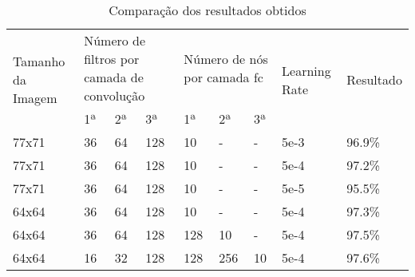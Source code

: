 \documentclass[conference]{IEEEtran}
\begin{document}
\begin{table*}[]
\centering
\begin{tabular}{|l|l|l|l|l|l|l|l|l|}
\hline
\multirow{2}{*}{Tamanho da Imagem} & \multicolumn{3}{l|}{Número de filtros por camada de convolução} & \multicolumn{3}{l|}{Número de nós por camada fc} & \multirow{2}{*}{Learning Rate} & \multirow{2}{*}{Resultado} \\ \cline{2-7}
                                   & 1ª                  & 2ª                  & 3ª                  & 1ª              & 2ª             & 3ª            &                                &                            \\ \hline
77x71                              & 36                  & 64                  & 128                 & 10              & -              & -             & 5e-3                           & 96.9\%                     \\ \hline
77x71                              & 36                  & 64                  & 128                 & 10              & -              & -             & 5e-4                           & 97.2\%                     \\ \hline
77x71                              & 36                  & 64                  & 128                 & 10              & -              & -             & 5e-5                           & 95.5\%                     \\ \hline
64x64                              & 36                  & 64                  & 128                 & 10              & -              & -             & 5e-4                           & 97.3\%                     \\ \hline
64x64                              & 36                  & 64                  & 128                 & 128             & 10             & -             & 5e-4                           & 97.5\%                     \\ \hline
64x64                              & 16                  & 32                  & 128                 & 128             & 256            & 10            & 5e-4                           & 97.6\%                     \\ \hline
\end{tabular}
\caption{Comparação dos resultados obtidos}
\label{table:results}
\end{table*}
\end{document}
